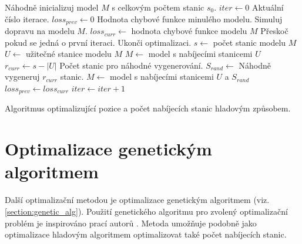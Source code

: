 \begin{algorithm}
\begin{algorithmic}
    \State Náhodně inicializuj model $M$ s celkovým počtem stanic $s_0$.
    \State $iter \gets 0$   \Comment Aktuální číslo iterace.
    \State $loss_{prev} \gets 0$    \Comment Hodnota chybové funkce minulého modelu.
        \State Simuluj dopravu na modelu $M$.
        \State $loss_{curr} \gets$ hodnota chybové funkce modelu $M$
             \Comment Přeskoč pokud se jedná o první iteraci.
                \State Ukonči optimalizaci.
            \EndIf
        \EndIf
        \State $s \gets$ počet stanic modelu $M$
        \State $U \gets$ užitečné stanice modelu $M$
            \State $M \gets$ model s nabíjecími stanicemi $U$
        \Else
            \State $r_{curr} \gets s - |U|$ \Comment Počet stanic pro náhodné vygenerování.
            \State $S_{rand} \gets$ Náhodně vygeneruj $r_{curr}$ stanic.
            \State $M \gets$ model s nabíjecími stanicemi $U$ a $S_{rand}$
            \State $loss_{prev} \gets loss_{curr}$
        \EndIf
        \State $iter \gets iter + 1$
    \EndWhile
\EndFunction
\end{algorithmic}
\caption{Algoritmus optimalizující pozice a počet nabíjecích stanic hladovým způsobem.}
\label{alg:greedy}
\end{algorithm}


\section{Optimalizace genetickým algoritmem}
\label{sec:genetic_optim}

Další optimalizační metodou je optimalizace genetickým algoritmem 
(viz. \cref{section:genetic_alg}). Použití genetického algoritmu pro zvolený
optimalizační problém je inspirováno prací autorů \citet{niccolai2021optimization}.
Metoda umožňuje podobně jako optimalizace hladovým algoritmem optimalizovat
také počet nabíjecích stanic.


